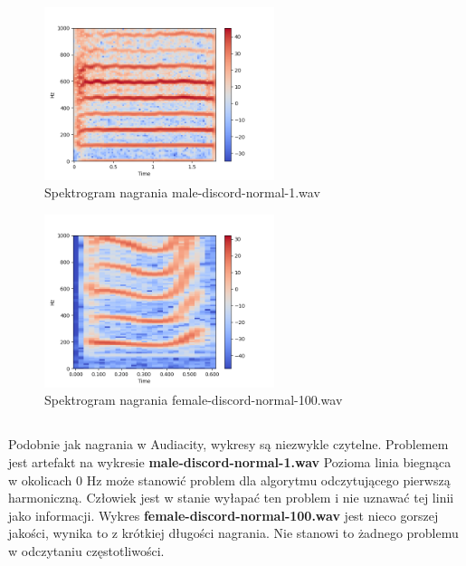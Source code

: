 \documentclass[a4paper,12pt]{extarticle}
\begin{document}
\begin{figure}[h]
\centering
\includegraphics[width=0.6\textwidth]{discord-1}
\caption{Spektrogram nagrania male-discord-normal-1.wav}
\end{figure}

\begin{figure}[h]
\centering
\includegraphics[width=0.6\textwidth]{discord-2}
\caption{Spektrogram nagrania female-discord-normal-100.wav}
\end{figure}

\newpage

\subsection*{}
Podobnie jak nagrania w Audiacity, wykresy są niezwykle czytelne. Problemem jest artefakt na wykresie \textbf{male-discord-normal-1.wav} Pozioma linia biegnąca w okolicach 0 Hz może stanowić problem dla algorytmu odczytującego pierwszą harmoniczną. Człowiek jest w stanie wyłapać ten problem i nie uznawać tej linii jako informacji. Wykres \textbf{female-discord-normal-100.wav} jest nieco gorszej jakości, wynika to z krótkiej długości nagrania. Nie stanowi to żadnego problemu w odczytaniu częstotliwości. \cite{discord}

\newpage

\end{document}
